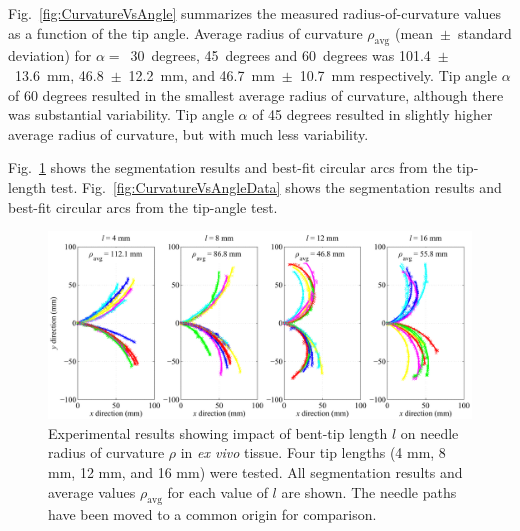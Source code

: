 Fig.~\ref{fig:CurvatureVsAngle} summarizes the measured radius-of-curvature values as a function of the tip angle. Average radius of curvature $\rho_{\text{avg}}$ (mean~$\pm$~standard deviation) for $\alpha =$~30~degrees, 45~degrees and 60~degrees was 101.4~$\pm$~13.6~mm, 46.8~$\pm$~12.2~mm, and 46.7~mm~$\pm$~10.7~mm respectively. Tip angle $\alpha$ of 60 degrees resulted in the smallest average radius of curvature, although there was substantial variability. Tip angle $\alpha$ of 45 degrees resulted in slightly higher average radius of curvature, but with much less variability.

Fig.~\ref{fig:CurvatureVsLengthData} shows the segmentation results and best-fit circular arcs from the tip-length test. Fig.~\ref{fig:CurvatureVsAngleData} shows the segmentation results and best-fit circular arcs from the tip-angle test.  

\begin{figure}[!t]
\centering
\includegraphics[width=\textwidth]{Images/Chapter3/CurvatureVsLength/CurvatureVsLengthData}%
\caption[Experimental results showing impact of bent-tip length]{Experimental results showing impact of bent-tip length $l$ on needle radius of curvature $\rho$ in \textit{ex vivo} tissue. Four tip lengths (4 mm, 8 mm, 12 mm, and 16 mm) were tested. All segmentation results and average values $\rho_{\text{avg}}$ for each value of $l$ are shown. The needle paths have been moved to a common origin for comparison.}
\label{fig:CurvatureVsLengthData}
\end{figure}


